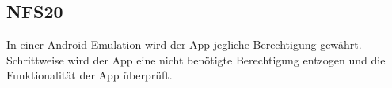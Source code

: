 \subsection*{NFS20}
In einer \Gls{Android}-\Gls{Emulation} wird der App jegliche Berechtigung gewährt.
Schrittweise wird der App eine nicht benötigte Berechtigung entzogen und die Funktionalität der App überprüft.